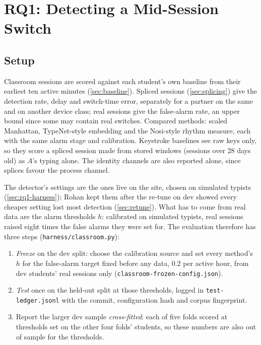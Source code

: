 \chapter{RQ1: Detecting a Mid-Session Switch}
\label{ch:rq1}

\section{Setup}
Classroom sessions are scored against each student's own baseline from their earliest ten
active minutes (\cref{sec:baseline}). Spliced sessions (\cref{sec:splicing}) give the
detection rate, delay and switch-time error, separately for a partner on the same and on
another device class; real sessions give the false-alarm rate, an upper bound since some
may contain real switches. Compared methods: scaled Manhattan, TypeNet-style embedding
and the Nosi-style rhythm measure, each with the same alarm stage and calibration.
Keystroke baselines see raw keys only, so they score a spliced session made from stored
windows (sessions over 28 days old) as $A$'s typing alone. The identity channels are also
reported alone, since splices favour the process channel.

The detector's settings are the ones live on the site, chosen on simulated typists
(\cref{sec:rq1-harness}); Rohan kept them after the re-tune on dev showed every cheaper
setting lost most detection (\cref{sec:retune}). What has to come from real data are the
alarm thresholds $h$: calibrated on simulated typists, real sessions raised eight times the
false alarms they were set for. The evaluation therefore has three steps
(\texttt{harness/classroom.py}):
\begin{enumerate}
  \item \emph{Freeze} on the dev split: choose the calibration source and set every method's
    $h$ for the false-alarm target fixed before any data, 0.2 per active hour, from dev
    students' real sessions only (\texttt{classroom-frozen-config.json}).
  \item \emph{Test} once on the held-out split at those thresholds, logged in
    \texttt{test-ledger.jsonl} with the commit, configuration hash and corpus fingerprint.
  \item Report the larger dev sample \emph{cross-fitted}: each of five folds scored at
    thresholds set on the other four folds' students, so these numbers are also out of
    sample for the thresholds.
\end{enumerate}

